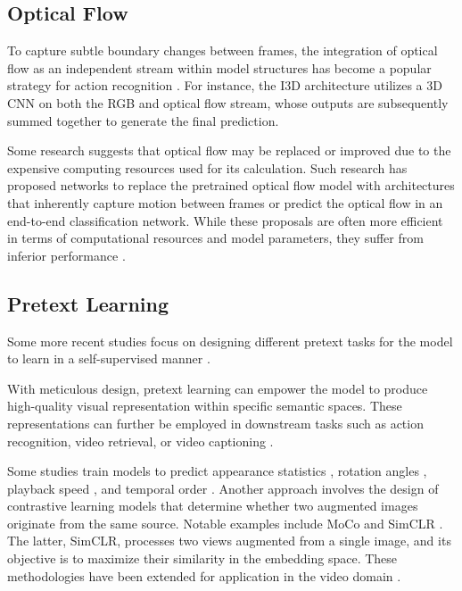 \subsection{Optical Flow}
To capture subtle boundary changes between frames, the integration of optical flow as an independent stream within model structures has become a popular strategy for action recognition \parencite{sevilla2019integration, tran2015learning, carreira2017quo}. For instance, the I3D architecture \parencite{carreira2017quo} utilizes a 3D CNN on both the RGB and optical flow stream, whose outputs are subsequently summed together to generate the final prediction. 


Some research suggests that optical flow may be replaced or improved due to the expensive computing resources used for its calculation. Such research has proposed networks to replace the pretrained optical flow model with architectures that inherently capture motion between frames or predict the optical flow in an end-to-end classification network. While these proposals are often more efficient in terms of computational resources and model parameters, they suffer from inferior performance \parencite{Lee_2018_ECCV, 8354283, Piergiovanni_2019_CVPR}.

\subsection{Pretext Learning}
Some more recent studies focus on designing different pretext tasks for the model to learn in a self-supervised manner \parencite{wang2022internvideo}.

With meticulous design, pretext learning can empower the model to produce high-quality visual representation within specific semantic spaces. These representations can further be employed in downstream tasks such as action recognition, video retrieval, or video captioning \parencite{10.1145/3577925}.

Some studies train models to predict appearance statistics \parencite{Wang_2019_CVPR}, rotation angles \parencite{DBLP:journals/corr/abs-1811-11387}, playback speed \parencite{Yao_2020_CVPR, 10.1007/978-3-030-58520-4_30}, and temporal order \parencite{10.1007/978-3-030-58604-1_26}. Another approach involves the design of contrastive learning models that determine whether two augmented images originate from the same source. Notable examples include MoCo \parencite{finn2017model} and SimCLR \parencite{pmlr-v119-chen20j}. The latter, SimCLR, processes two views augmented from a single image, and its objective is to maximize their similarity in the embedding space. These methodologies have been extended for application in the video domain \parencite{Feichtenhofer_2021_CVPR}.

